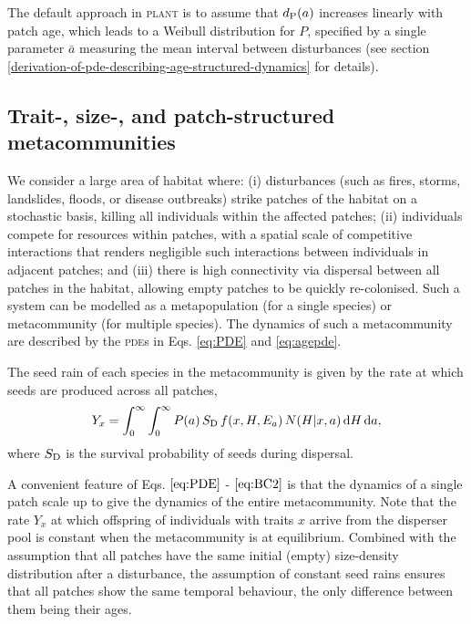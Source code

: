 \documentclass[10pt,twoside]{article}
\newcommand{\plant}{\textsc{plant}}
\begin{document}
The default approach in {\plant} is to assume that $d_{\rm P}(a)$
increases linearly with patch age, which leads to a Weibull distribution for $P$,
specified by a single parameter $\bar{a}$
measuring the mean interval between disturbances (see section \ref{derivation-of-pde-describing-age-structured-dynamics} for details).

\subsection{Trait-, size-, and patch-structured
metacommunities}\label{trait--size--and-patch-structured-metapopulations}

We consider a large area of habitat where: (i) disturbances (such as fires,
storms, landslides, floods, or disease outbreaks) strike patches of the
habitat on a stochastic basis, killing all individuals within the affected
patches; (ii) individuals compete for resources within patches, with a
spatial scale of competitive interactions that renders negligible such interactions between
individuals in adjacent patches; and (iii) there is high
connectivity via dispersal between all patches in the habitat, allowing
empty patches to be quickly re-colonised. Such a system can be modelled
as a metapopulation (for a single species) or metacommunity (for multiple
species). The dynamics of such a metacommunity are described by the
\textsc{pde}s in Eqs. \ref{eq:PDE} and \ref{eq:agepde}.

The seed rain of each species in the metacommunity is given by the rate at
which seeds are produced across all patches,
\begin{equation} \label{eq:seed_rain}
Y_x  = \int_0^{\infty} \int_0^{\infty} P(a) \, S_{\rm D} \, f(x, H, E_a) \, N(H | x, a) \, {\rm d} H \, {\rm d} a,
\end{equation}
where \(S_{\rm D}\) is the survival probability of seeds during dispersal.

A convenient feature of Eqs. \(\ref{eq:PDE}\) - \(\ref{eq:BC2}\) is that
the dynamics of a single patch scale up to give the dynamics of the
entire metacommunity. Note that the rate \(Y_x\) at which offspring of individuals with traits $x$ arrive from the
disperser pool is constant when the metacommunity is at
equilibrium. Combined with the assumption that all patches have the same
initial (empty) size-density distribution after a disturbance, the assumption of constant seed rains
ensures that all patches show the same temporal behaviour, the only
difference between them being their ages.
\end{document}
